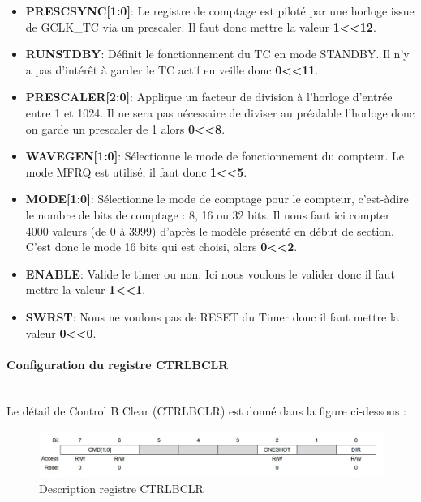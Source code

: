 \documentclass[a4paper]{article}
\begin{document}
	\begin{itemize}
		\item {\bf PRESCSYNC[1:0]}: Le registre de comptage est piloté par une horloge issue de GCLK\_TC via un prescaler. Il faut donc mettre la valeur {\bf 1\textless\textless12}.~~\\
		\item {\bf RUNSTDBY}: Définit le fonctionnement du TC en mode STANDBY. Il n’y a pas d’intérêt à garder le TC actif en veille donc {\bf 0\textless\textless11}.~~\\
		\item {\bf PRESCALER[2:0]}: Applique un facteur de division à l’horloge d’entrée entre 1 et 1024. Il ne sera pas nécessaire de diviser au préalable l’horloge donc on garde un prescaler de 1 alors {\bf 0\textless\textless8}.~~\\
		\item {\bf WAVEGEN[1:0]}: Sélectionne le mode de fonctionnement du compteur. Le mode MFRQ est utilisé, il faut donc {\bf 1\textless\textless5}.~~\\
		\item {\bf MODE[1:0]}: Sélectionne le mode de comptage pour le compteur, c’est-àdire le nombre de bits de comptage : 8, 16 ou 32 bits. Il nous faut ici compter 4000 valeurs (de 0 à 3999) d’après le modèle présenté en début de section. C’est donc le mode 16 bits qui est choisi, alors {\bf 0\textless\textless2}.~~\\
		\item {\bf ENABLE}: Valide le timer ou non. Ici nous voulons le valider donc il faut mettre la valeur {\bf 1\textless\textless1}.~~\\
		\item {\bf SWRST}: Nous ne voulons pas de RESET du Timer donc il faut mettre la valeur {\bf 0\textless\textless0}.~~\\
	\end{itemize}
	
	\newpage
	\paragraph{Configuration du registre CTRLBCLR} 
	~~\\
	Le détail de Control B Clear (CTRLBCLR) est donné dans la figure ci-dessous :
	\begin{figure}[H]
		\centering
		\includegraphics[width=0.9\linewidth]{CTRLBCLR.jpg}
		\caption{Description registre CTRLBCLR}
	\end{figure}
	
\end{document}

